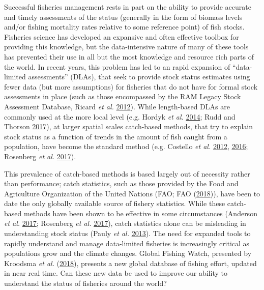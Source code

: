 \documentclass[twoside,12pt,final]{ucthesis-CA2012}
\begin{document}
\begin{ucmainmatter}
Successful fisheries management rests in part on the ability to provide
accurate and timely assessments of the status (generally in the form of
biomass levels and/or fishing mortality rates relative to some reference
point) of fish stocks. Fisheries science has developed an expansive and
often effective toolbox for providing this knowledge, but the
data-intensive nature of many of these tools has prevented their use in
all but the most knowledge and resource rich parts of the world. In
recent years, this problem has led to an rapid expansion of
``data-limited assessments'' (DLAs), that seek to provide stock status
estimates using fewer data (but more assumptions) for fisheries that do
not have for formal stock assessments in place (such as those
encompassed by the RAM Legacy Stock Assessment Database, Ricard \emph{et
al.} \protect\hyperlink{ref-Ricard2012}{2012}). While length-based DLAs
are commonly used at the more local level (e.g. Hordyk \emph{et al.}
\protect\hyperlink{ref-Hordyk2014}{2014}; Rudd and Thorson
\protect\hyperlink{ref-Rudd2017}{2017}), at larger spatial scales
catch-based methods, that try to explain stock status as a function of
trends in the amount of fish caught from a population, have become the
standard method (e.g. Costello \emph{et al.}
\protect\hyperlink{ref-Costello2012a}{2012},
\protect\hyperlink{ref-Costello2016}{2016}; Rosenberg \emph{et al.}
\protect\hyperlink{ref-Rosenberg2017}{2017}).

This prevalence of catch-based methods is based largely out of necessity
rather than performance; catch statistics, such as those provided by the
Food and Agriculture Organization of the United Nations (FAO; FAO
(\protect\hyperlink{ref-FAO2018}{2018})), have been to date the only
globally available source of fishery statistics. While these catch-based
methods have been shown to be effective in some circumstances (Anderson
\emph{et al.} \protect\hyperlink{ref-Anderson2017b}{2017}; Rosenberg
\emph{et al.} \protect\hyperlink{ref-Rosenberg2017}{2017}), catch
statistics alone can be misleading in understanding stock status (Pauly
\emph{et al.} \protect\hyperlink{ref-Pauly2013}{2013}). The need for
expanded tools to rapidly understand and manage data-limited fisheries
is increasingly critical as populations grow and the climate changes.
Global Fishing Watch, presented by Kroodsma \emph{et al.}
(\protect\hyperlink{ref-Kroodsma2018}{2018}), presents a new global
database of fishing effort, updated in near real time. Can these new
data be used to improve our ability to understand the status of
fisheries around the world?


\end{ucmainmatter}
\end{document}
